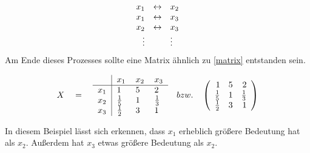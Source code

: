 \[\begin{array}{rcl}
\centering
x_1 &\leftrightarrow &x_2 \\
x_1 &\leftrightarrow &x_3 \\
x_2 &\leftrightarrow &x_3 \\
\vdots &                &\vdots
\end{array}\]
Am Ende dieses Prozesses sollte eine Matrix ähnlich zu \ref{matrix} entstanden sein.
\begin{table}[h!]
	\centering
	\[X\quad = \quad\begin{tabular}{l|llll}
	& $x_1$ & $x_2$ &  $x_3$  \\ \hline
	$x_1$ &   1   &   5   &   2   \\
	$x_2$	&$\frac{1}{5}$&   1   &$\frac{1}{3}$     \\
	$x_3$	&$\frac{1}{2}$&   3   &   1         
	\end{tabular} 	  
	\quad bzw. \quad
	\left( \begin{array}{rrrr}
	1   &   5   &   2   \\
	\frac{1}{5}&   1   &\frac{1}{3}     \\
	\frac{1}{2}&   3   &   1        
	\end{array}\right) 
	\]
	\caption{Matrix}
	\label{matrix}
\end{table}
In diesem Beispiel lässt sich erkennen, dass $x_1$ erheblich größere Bedeutung hat als $x_2$. Außerdem hat $x_3$ etwas größere Bedeutung als $x_2$.
